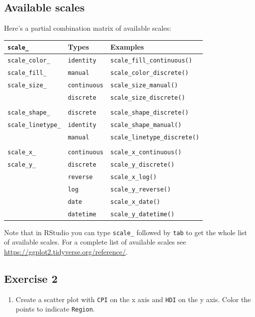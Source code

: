 \documentclass[
]{book}
\providecommand{\tightlist}{%
  \setlength{\itemsep}{0pt}\setlength{\parskip}{0pt}}
\begin{document}
\hypertarget{available-scales}{%
\subsection{Available scales}\label{available-scales}}

Here's a partial combination matrix of available scales:

\begin{longtable}[]{@{}lll@{}}
\toprule
\texttt{scale\_} & Types & Examples\tabularnewline
\midrule
\endhead
\texttt{scale\_color\_} & \texttt{identity} & \texttt{scale\_fill\_continuous()}\tabularnewline
\texttt{scale\_fill\_} & \texttt{manual} & \texttt{scale\_color\_discrete()}\tabularnewline
\texttt{scale\_size\_} & \texttt{continuous} & \texttt{scale\_size\_manual()}\tabularnewline
& \texttt{discrete} & \texttt{scale\_size\_discrete()}\tabularnewline
& &\tabularnewline
\texttt{scale\_shape\_} & \texttt{discrete} & \texttt{scale\_shape\_discrete()}\tabularnewline
\texttt{scale\_linetype\_} & \texttt{identity} & \texttt{scale\_shape\_manual()}\tabularnewline
& \texttt{manual} & \texttt{scale\_linetype\_discrete()}\tabularnewline
& &\tabularnewline
\texttt{scale\_x\_} & \texttt{continuous} & \texttt{scale\_x\_continuous()}\tabularnewline
\texttt{scale\_y\_} & \texttt{discrete} & \texttt{scale\_y\_discrete()}\tabularnewline
& \texttt{reverse} & \texttt{scale\_x\_log()}\tabularnewline
& \texttt{log} & \texttt{scale\_y\_reverse()}\tabularnewline
& \texttt{date} & \texttt{scale\_x\_date()}\tabularnewline
& \texttt{datetime} & \texttt{scale\_y\_datetime()}\tabularnewline
\bottomrule
\end{longtable}

Note that in RStudio you can type \texttt{scale\_} followed by \texttt{tab} to get the whole list of available scales. For a complete list of available scales see \url{https://ggplot2.tidyverse.org/reference/}.

\hypertarget{exercise-2-1}{%
\subsection{Exercise 2}\label{exercise-2-1}}

\begin{enumerate}
\def\labelenumi{\arabic{enumi}.}
\tightlist
\item
  Create a scatter plot with \texttt{CPI} on the x axis and \texttt{HDI} on the y axis. Color the points to indicate \texttt{Region}.
\end{enumerate}
\end{document}
